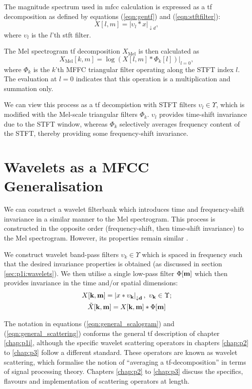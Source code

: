 The magnitude spectrum used in \ac{mfcc} calculation is expressed as a \ac{tf} decomposition as defined by equations (\ref*{eqn:gentf}) and (\ref*{eqn:stftfilter}):
\begin{equation}
    X[l, m] = |\upsilon_l * x|_{\downarrow d},
\end{equation}
where $\upsilon_l$ is the $l$'th \ac{stft} filter.

The Mel spectrogram \ac{tf} decomposition $X_\text{Mel}$ is then calculated as
\begin{equation}
    X_\text{Mel}[k, m] = \log\left(X[l, m] * \Phi_k[l]\right) \bigg|_{l = 0},
\end{equation}
where $\Phi_k$ is the $k$'th MFFC triangular filter operating along the STFT index $l$. The evaluation at $l=0$ indicates that this operation is a multiplication and summation only. 

We can view this process as a \ac{tf} decompistion with STFT filters $\upsilon_l \in \Upsilon$, which is modified with the Mel-scale triangular filters $\Phi_k$. $\upsilon_l$ provides time-shift invariance due to the STFT window, whereas $\Phi_k$ selectively averages frequency content of the STFT, thereby providing some frequency-shift invariance.


\section{Wavelets as a MFCC Generalisation}

We can construct a wavelet filterbank which introduces time and frequency-shift invariance in a similar manner to the Mel spectrogram. This process is constructed in the opposite order (frequency-shift, then time-shift invariance) to the Mel spectrogram. However, its properties remain similar \cite{ws}.

We construct wavelet band-pass filters $\upsilon_k \in \Upsilon$ which is spaced in frequency such that the desired invariance properties is obtained (as discussed in section \ref*{sec:p1i:wavelets}). We then utilise a single low-pass filter $\Phi[\boldsymbol{\mathbf{m}}]$ which then provides invariance in the time and/or spatial dimensions:
\begin{gather}
    \label{eqn:general_scalogram}
    X[\boldsymbol{\mathbf{k}}, \boldsymbol{\mathbf{m}}] = \left|x * \upsilon_{\boldsymbol{\mathbf{k}}}\right|_{\downarrow \boldsymbol{\mathbf{d}}}, \ \upsilon_{\boldsymbol{\mathbf{k}}} \in \Upsilon; \\
    \label{eqn:general_scattering}
    \tilde{X}[\boldsymbol{\mathbf{k}}, \boldsymbol{\mathbf{m}}] = X[\boldsymbol{\mathbf{k}}, \boldsymbol{\mathbf{m}}] * \Phi[\boldsymbol{\mathbf{m}}]
\end{gather}

The notation in equations (\ref*{eqn:general_scalogram}) and (\ref*{eqn:general_scattering}) conforms the general \ac{tf} description of chapter \ref*{chap:p1i}, although the specific wavelet scattering operators in chapters \ref*{chap:p2} to \ref*{chap:p3} follow a different standard. These operators are known as wavelet scattering, which formalise the notion of ``averaging a \ac{tf}-decomposition'' in terms of signal processing theory. Chapters \ref*{chap:p2} to \ref*{chap:p3} discuss the specifics, flavours and implementation of scattering operators at length.

